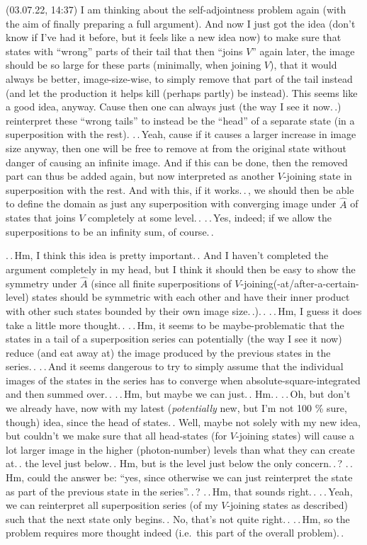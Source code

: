 \documentclass{report}
\begin{document}
(03.07.22, 14:37) I am thinking about the self-adjointness problem again (with the aim of finally preparing a full argument). And now I just got the idea (don't know if I've had it before, but it feels like a new idea now) to make sure that states with ``wrong'' parts of their tail that then ``joins $V$'' again later, the image should be so large for these parts (minimally, when joining $V$), that it would always be better, image-size-wise, to simply remove that part of the tail instead (and let the production it helps kill (perhaps partly) be instead). This seems like a good idea, anyway. Cause then one can always just (the way I see it now.\,.) reinterpret these ``wrong tails'' to instead be the ``head'' of a separate state (in a superposition with the rest). %
.\,.\,Yeah, cause if it causes a larger increase in image size anyway, then one will be free to remove at from the original state without danger of causing an infinite image. And if this can be done, then the removed part can thus be added again, but now interpreted as another $V$-joining state in superposition with the rest. And with this, if it works.\,.\,, we should then be able to define the domain as just any superposition with converging image under $\hat A$ of states that joins $V$ completely at some level.\,. .\,.\,Yes, indeed; if we allow the superpositions to be an infinity sum, of course.\,. %

.\,.\,Hm, I think this idea is pretty important.\,. And I haven't completed the argument completely in my head, but I think it should then be easy to show the symmetry under $\hat A$ (since all finite superpositions of $V$-joining(-at/after-a-certain-level) states should be symmetric with each other and have their inner product with other such states bounded by their own image size.\,.).\,. %
.\,.\,Hm, I guess it does take a little more thought.\,. %
.\,.\,Hm, it seems to be maybe-problematic that the states in a tail of a superposition series can potentially (the way I see it now) reduce (and eat away at) the image produced by the previous states in the series.\,. %
.\,.\,And it seems dangerous to try to simply assume that the individual images of the states in the series has to converge when absolute-square-integrated and then summed over.\,. 
.\,.\,Hm, but maybe we can just.\,. Hm.\,. .\,.\,Oh, but don't we already have, now with my latest (\emph{potentially} new, but I'm not 100 \% sure, though) idea, since the head of states.\,. Well, maybe not solely with my new idea, but couldn't we make sure that all head-states (for $V$-joining states) will cause a lot larger image in the higher (photon-number) levels than what they can create at.\,. the level just below.\,. Hm, but is the level just below the only concern.\,.\,? %
.\,.\,Hm, could the answer be: ``yes, since otherwise we can just reinterpret the state as part of the previous state in the series''.\,.\,? %
.\,.\,Hm, that sounds right.\,. .\,.\,Yeah, we can reinterpret all superposition series (of my $V$-joining states as described) such that the next state only begins.\,. No, that's not quite right.\,. .\,.\,Hm, so the problem requires more thought indeed (i.e.\ this part of the overall problem).\,. %
\end{document}
